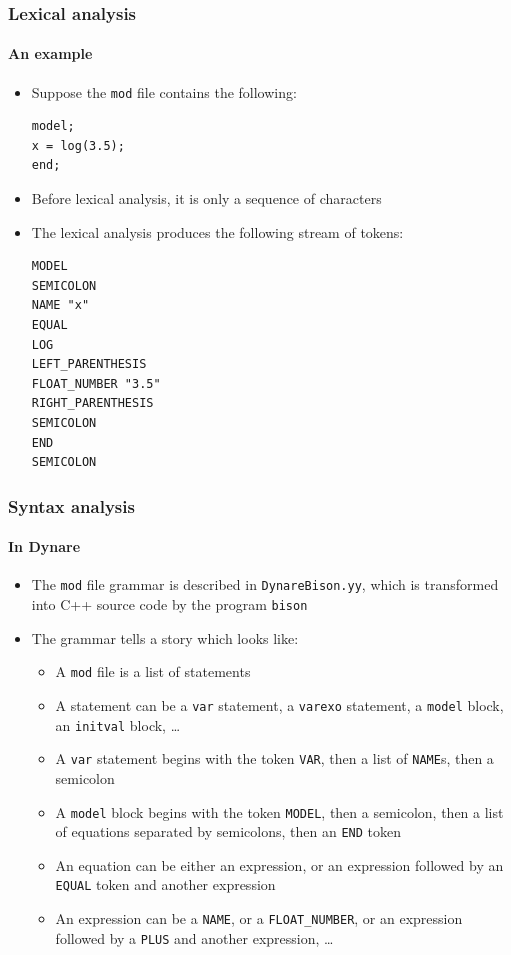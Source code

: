 \documentclass{beamer}
\begin{document}
\begin{frame}[fragile]
\frametitle{Lexical analysis}
\framesubtitle{An example}
\begin{itemize}
\item Suppose the \texttt{mod} file contains the following:
\begin{verbatim}
model;
x = log(3.5);
end;
\end{verbatim}
\item Before lexical analysis, it is only a sequence of characters
\item The lexical analysis produces the following stream of tokens:

\begin{footnotesize}
\begin{verbatim}
MODEL
SEMICOLON
NAME "x"
EQUAL
LOG
LEFT_PARENTHESIS
FLOAT_NUMBER "3.5"
RIGHT_PARENTHESIS
SEMICOLON
END
SEMICOLON
\end{verbatim}
\end{footnotesize}
\end{itemize}
\end{frame}

\begin{frame}
\frametitle{Syntax analysis}
\framesubtitle{In Dynare}
\begin{itemize}
\item The \texttt{mod} file grammar is described in \texttt{DynareBison.yy}, which is transformed into C++ source code by the program \texttt{bison}
\item The grammar tells a story which looks like:
  \begin{itemize}
  \item A \texttt{mod} file is a list of statements
  \item A statement can be a \texttt{var} statement, a \texttt{varexo} statement, a \texttt{model} block, an \texttt{initval} block, \ldots
  \item A \texttt{var} statement begins with the token \texttt{VAR}, then a list of \texttt{NAME}s, then a semicolon
  \item A \texttt{model} block begins with the token \texttt{MODEL}, then a semicolon, then a list of equations separated by semicolons, then an \texttt{END} token
  \item An equation can be either an expression, or an expression followed by an \texttt{EQUAL} token and another expression
  \item An expression can be a \texttt{NAME}, or a \texttt{FLOAT\_NUMBER}, or an expression followed by a \texttt{PLUS} and another expression, \ldots
  \end{itemize}
\end{itemize}
\end{frame}
\end{document}
